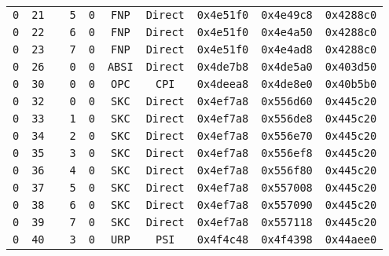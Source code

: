 \begin{adjustwidth}{5ex}{1ex}
\begin{tabular}{cccccccccc}
		\texttt{0} & \texttt{21} & & \texttt{5} & \texttt{0} & \texttt{FNP} & \texttt{Direct} & \texttt{0x4e51f0} & \texttt{0x4e49c8} & \texttt{0x4288c0} \\
		\texttt{0} & \texttt{22} & & \texttt{6} & \texttt{0} & \texttt{FNP} & \texttt{Direct} & \texttt{0x4e51f0} & \texttt{0x4e4a50} & \texttt{0x4288c0} \\
		\texttt{0} & \texttt{23} & & \texttt{7} & \texttt{0} & \texttt{FNP} & \texttt{Direct} & \texttt{0x4e51f0} & \texttt{0x4e4ad8} & \texttt{0x4288c0} \\
		\texttt{0} & \texttt{26} & & \texttt{0} & \texttt{0} & \texttt{ABSI} & \texttt{Direct} & \texttt{0x4de7b8} & \texttt{0x4de5a0} & \texttt{0x403d50} \\
		\texttt{0} & \texttt{30} & & \texttt{0} & \texttt{0} & \texttt{OPC} & \texttt{CPI} & \texttt{0x4deea8} & \texttt{0x4de8e0} & \texttt{0x40b5b0} \\
		\texttt{0} & \texttt{32} & & \texttt{0} & \texttt{0} & \texttt{SKC} & \texttt{Direct} & \texttt{0x4ef7a8} & \texttt{0x556d60} & \texttt{0x445c20} \\
		\texttt{0} & \texttt{33} & & \texttt{1} & \texttt{0} & \texttt{SKC} & \texttt{Direct} & \texttt{0x4ef7a8} & \texttt{0x556de8} & \texttt{0x445c20} \\
		\texttt{0} & \texttt{34} & & \texttt{2} & \texttt{0} & \texttt{SKC} & \texttt{Direct} & \texttt{0x4ef7a8} & \texttt{0x556e70} & \texttt{0x445c20} \\
		\texttt{0} & \texttt{35} & & \texttt{3} & \texttt{0} & \texttt{SKC} & \texttt{Direct} & \texttt{0x4ef7a8} & \texttt{0x556ef8} & \texttt{0x445c20} \\
		\texttt{0} & \texttt{36} & & \texttt{4} & \texttt{0} & \texttt{SKC} & \texttt{Direct} & \texttt{0x4ef7a8} & \texttt{0x556f80} & \texttt{0x445c20} \\
		\texttt{0} & \texttt{37} & & \texttt{5} & \texttt{0} & \texttt{SKC} & \texttt{Direct} & \texttt{0x4ef7a8} & \texttt{0x557008} & \texttt{0x445c20} \\
		\texttt{0} & \texttt{38} & & \texttt{6} & \texttt{0} & \texttt{SKC} & \texttt{Direct} & \texttt{0x4ef7a8} & \texttt{0x557090} & \texttt{0x445c20} \\
		\texttt{0} & \texttt{39} & & \texttt{7} & \texttt{0} & \texttt{SKC} & \texttt{Direct} & \texttt{0x4ef7a8} & \texttt{0x557118} & \texttt{0x445c20} \\
		\texttt{0} & \texttt{40} & & \texttt{3} & \texttt{0} & \texttt{URP} & \texttt{PSI} & \texttt{0x4f4c48} & \texttt{0x4f4398} & \texttt{0x44aee0} \\

\end{tabular}
\end{adjustwidth}
